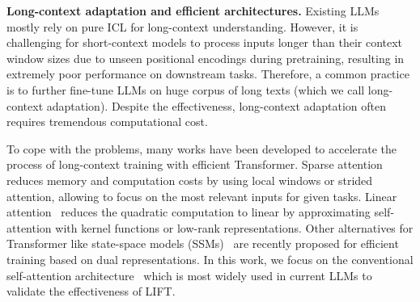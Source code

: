 

\textbf{Long-context adaptation and efficient architectures. } Existing LLMs mostly rely on pure ICL for long-context understanding. However, it is challenging for short-context models to process inputs longer than their context window sizes due to unseen positional encodings during pretraining, resulting in extremely poor performance on downstream tasks. Therefore, a common practice is to further fine-tune LLMs on huge corpus of long texts (which we call long-context adaptation). Despite the effectiveness, long-context adaptation often requires tremendous computational cost.

To cope with the problems, many works have been developed to accelerate the process of long-context training with efficient Transformer. Sparse attention~\citep{kitaev2020reformer, wang2020linformer, beltagy2020longformer} reduces memory and computation costs by using local windows or strided attention, allowing to focus on the most relevant inputs for given tasks. Linear attention~\citep{shen2021efficient} reduces the quadratic computation to linear by approximating self-attention with kernel functions or low-rank representations. Other alternatives for Transformer like state-space models (SSMs)~\citep{gu2023mamba} are recently proposed for efficient training based on dual representations. In this work, we focus on the conventional self-attention architecture~\citep{vaswani2017attention} which is most widely used in current LLMs to validate the effectiveness of LIFT.

